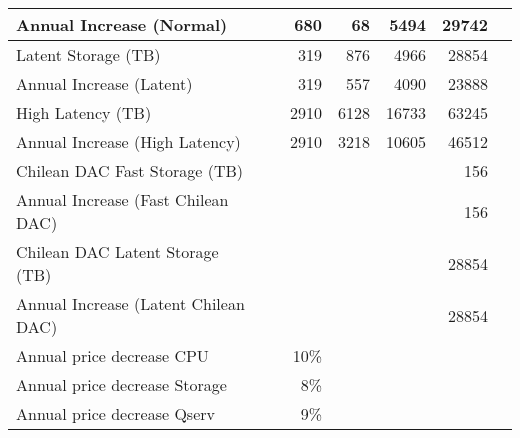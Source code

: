 \begin{longtable} { |p{}  |r  |r  |r  |r  |r  |r |}
{Annual Increase (Normal)}&{}&{680}&{68}&{5494}&{29742} \\ \hline
{Latent Storage  (TB)}&{}&{319}&{876}&{4966}&{28854} \\ \hline
{Annual Increase (Latent)}&{}&{319}&{557}&{4090}&{23888} \\ \hline
{High Latency (TB)}&{}&{2910}&{6128}&{16733}&{63245} \\ \hline
{Annual Increase (High Latency)}&{}&{2910}&{3218}&{10605}&{46512} \\ \hline
{Chilean DAC Fast Storage (TB)}&{}&{}&{}&{}&{156} \\ \hline
{Annual Increase (Fast Chilean DAC)}&{}&{}&{}&{}&{156} \\ \hline
{Chilean DAC Latent Storage (TB)}&{}&{}&{}&{}&{28854} \\ \hline
{Annual Increase (Latent Chilean DAC)}&{}&{}&{}&{}&{28854} \\ \hline
{Annual price decrease CPU}&{}&{10\%}&{}&{}&{} \\ \hline
{Annual price decrease Storage}&{}&{8\%}&{}&{}&{} \\ \hline
{Annual price decrease Qserv}&{}&{9\%}&{}&{}&{} \\ \hline
\end{longtable} \normalsize
